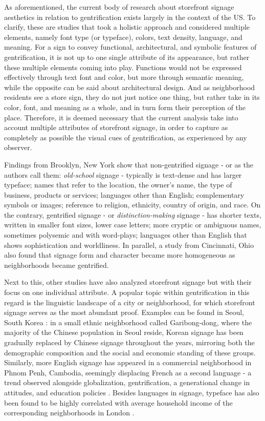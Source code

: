 As aforementioned, the current body of research about storefront signage aesthetics in relation to gentrification exists largely in the context of the US. To clarify, these are studies that took a holistic approach and considered multiple elements, namely font type (or typeface), colors, text density, language, and meaning. For a sign to convey functional, architectural, and symbolic features of gentrification, it is not up to one single attribute of its appearance, but rather these multiple elements coming into play. Functions would not be expressed effectively through text font and color, but more through semantic meaning, while the opposite can be said about architectural design. And as neighborhood residents see a store sign, they do not just notice one thing, but rather take in its color, font, and meaning as a whole, and in turn form their perception of the place. Therefore, it is deemed necessary that the current analysis take into account multiple attributes of storefront signage, in order to capture as completely as possible the visual cues of gentrification, as experienced by any observer.

Findings from Brooklyn, New York\cite{trinch_signsays_2017, snajdr_oldschool_2018, snajdr_preserve_2022} show that non-gentrified signage - or as the authors call them: \textit{old-school} signage - typically is text-dense and has larger typeface; names that refer to the location, the owner's name, the type of business, products or services; languages other than English; complementary symbols or images; reference to religion, ethnicity, country of origin, and race. On the contrary, gentrified signage - or \textit{distinction-making} signage - has shorter texts, written in smaller font sizes, lower case letters; more cryptic or ambiguous names, sometimes polysemic and with word-plays; languages other than English that shows sophistication and worldliness. In parallel, a study from Cincinnati, Ohio \cite{rahman2020} also found that signage form and character became more homogeneous as neighborhoods became gentrified.

Next to this, other studies have also analyzed storefront signage but with their focus on one individual attribute. A popular topic within gentrification in this regard is the linguistic landscape of a city or neighborhood, for which storefront signage serves as the most abundant proof. Examples can be found in Seoul, South Korea \cite{hong2020}: in a small ethnic neighborhood called Garibong-dong, where the majority of the Chinese population in Seoul reside, Korean signage has been gradually replaced by Chinese signage throughout the years, mirroring both the demographic composition and the social and economic standing of these groups. Similarly, more English signage has appeared in a commercial neighborhood in Phnom Penh, Cambodia, seemingly displacing French as a second language - a trend observed alongside globalization, gentrification, a generational change in attitudes, and education policies \cite{kasanga2012}. Besides languages in signage, typeface has also been found to be highly correlated with average household income of the corresponding neighborhoods in London \cite{ma2019}.

